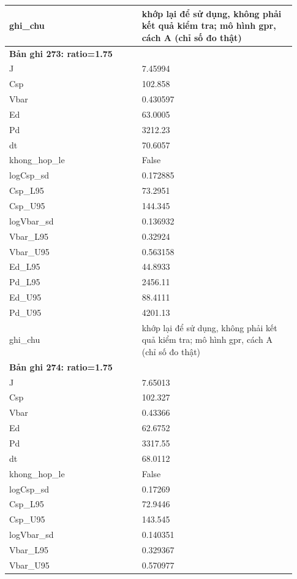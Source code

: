 \begin{longtable}{p{0.43\linewidth}p{0.50\linewidth}}
ghi\_\allowbreak chu & khớp lại để sử dụng, không phải kết quả kiểm tra; mô hình gpr, cách A (chỉ số đo thật) \\
\midrule
\multicolumn{2}{p{0.95\linewidth}}{\textbf{Bản ghi 273: ratio=1.75}} \\
J & 7.45994 \\
Csp & 102.858 \\
Vbar & 0.430597 \\
Ed & 63.0005 \\
Pd & 3212.23 \\
dt & 70.6057 \\
khong\_\allowbreak hop\_\allowbreak le & False \\
logCsp\_\allowbreak sd & 0.172885 \\
Csp\_\allowbreak L95 & 73.2951 \\
Csp\_\allowbreak U95 & 144.345 \\
logVbar\_\allowbreak sd & 0.136932 \\
Vbar\_\allowbreak L95 & 0.32924 \\
Vbar\_\allowbreak U95 & 0.563158 \\
Ed\_\allowbreak L95 & 44.8933 \\
Pd\_\allowbreak L95 & 2456.11 \\
Ed\_\allowbreak U95 & 88.4111 \\
Pd\_\allowbreak U95 & 4201.13 \\
ghi\_\allowbreak chu & khớp lại để sử dụng, không phải kết quả kiểm tra; mô hình gpr, cách A (chỉ số đo thật) \\
\midrule
\multicolumn{2}{p{0.95\linewidth}}{\textbf{Bản ghi 274: ratio=1.75}} \\
J & 7.65013 \\
Csp & 102.327 \\
Vbar & 0.43366 \\
Ed & 62.6752 \\
Pd & 3317.55 \\
dt & 68.0112 \\
khong\_\allowbreak hop\_\allowbreak le & False \\
logCsp\_\allowbreak sd & 0.17269 \\
Csp\_\allowbreak L95 & 72.9446 \\
Csp\_\allowbreak U95 & 143.545 \\
logVbar\_\allowbreak sd & 0.140351 \\
Vbar\_\allowbreak L95 & 0.329367 \\
Vbar\_\allowbreak U95 & 0.570977 \\

\end{longtable}
